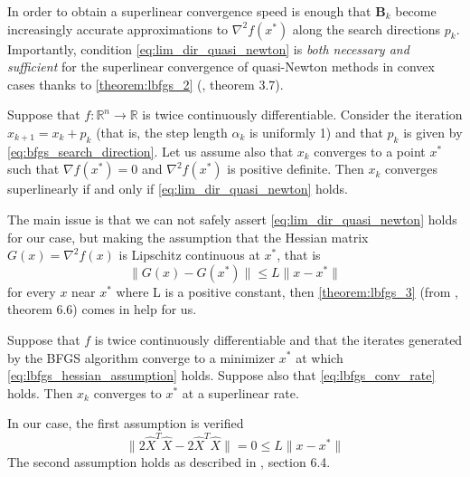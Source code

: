 \noindent In order to obtain a superlinear convergence speed is enough that $\mathbf{B}_k$ become increasingly accurate approximations to $\nabla^2 f(x^*)$ along the search directions $p_k$. Importantly, condition \eqref{eq:lim_dir_quasi_newton} is \textit{both necessary and sufficient} for the superlinear convergence of quasi-Newton methods in convex cases thanks to \autoref{theorem:lbfgs_2} (\cite{nocedal1999numerical}, theorem 3.7).
\begin{theorem}
    Suppose that $f : \mathbb{R}^{n} \xrightarrow{} \mathbb{R}$ is twice continuously differentiable. Consider the iteration $x_{k+1} = x_k + p_k$ (that is, the step length $\alpha_k$ is uniformly 1) and that $p_k$ is given by \eqref{eq:bfgs_search_direction}. Let us assume also that {$x_k$} converges to a point $x^*$ such that $\nabla f(x^*) = 0$ and $\nabla^2 f(x^*)$ is positive definite. Then {$x_k$} converges superlinearly if and only if \eqref{eq:lim_dir_quasi_newton} holds.
    \label{theorem:lbfgs_2}
\end{theorem}

\noindent The main issue is that we can not safely assert \eqref{eq:lim_dir_quasi_newton} holds for our case, but making the assumption that the Hessian matrix $G(x)=\nabla^2f(x)$ is Lipschitz continuous at $x^*$, that is
\begin{equation}
    \lVert G(x)-G(x^*)\rVert \leq L\lVert x - x^*\rVert
    \label{eq:lbfgs_hessian_assumption}
\end{equation}
for every $x$ near $x^*$ where L is a positive constant, then \autoref{theorem:lbfgs_3} (from \cite{nocedal1999numerical}, theorem 6.6) comes in help for us.
\begin{theorem}
     Suppose that $f$ is twice continuously differentiable and that the iterates generated by the BFGS algorithm converge to a minimizer $x^*$ at which \eqref{eq:lbfgs_hessian_assumption} holds. Suppose also that \eqref{eq:lbfgs_conv_rate} holds. Then $x_k$ converges to $x^*$ at a superlinear rate.
     \label{theorem:lbfgs_3}
\end{theorem}

\noindent In our case, the first assumption is verified
\begin{equation}
    \lVert 2 \hat{X}^T \hat{X} - 2 \hat{X}^T \hat{X} \rVert = 0 \leq L \lVert x - x^* \rVert
\end{equation}
The second assumption holds as described in \cite{nocedal1999numerical}, section 6.4.
\vspace{3mm}

